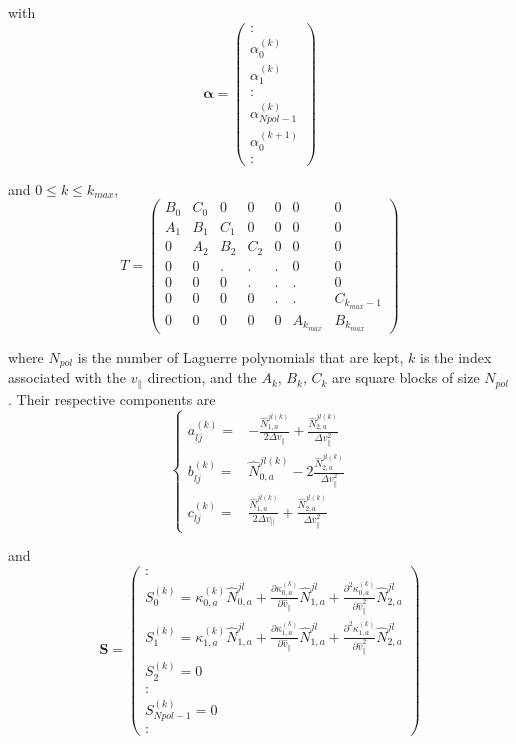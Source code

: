 \documentclass[11pt,preprint]{elsarticle}
\begin{document}
with 
\[
\boldsymbol{\alpha}=\left(\begin{array}{c}
:\\
\alpha_{0}^{(k)}\\
\alpha_{1}^{(k)}\\
:\\
\alpha_{Npol-1}^{(k)}\\
\alpha_{0}^{(k+1)}\\
:
\end{array}\right)
\]


and $0\leq k\leq k_{max}$,
\[
T=\left(\begin{array}{ccccccc}
B_{0} & C_{0} & 0 & 0 & 0 & 0 & 0\\
A_{1} & B_{1} & C_{1} & 0 & 0 & 0 & 0\\
0 & A_{2} & B_{2} & C_{2} & 0 & 0 & 0\\
0 & 0 & . & . & . & 0 & 0\\
0 & 0 & 0 & . & . & . & 0\\
0 & 0 & 0 & 0 & . & . & C_{k_{max}-1}\\
0 & 0 & 0 & 0 & 0 & A_{k_{max}} & B_{k_{max}}
\end{array}\right)
\]


where $N_{pol}$ is the number of Laguerre polynomials that are kept,
$k$ is the index associated with the $v_{\parallel}$ direction,
and the $A_{k}$, $B_{k}$, $C_{k}$ are square blocks of size $N_{pol}$.
Their respective components are
\[
\begin{cases}
a_{lj}^{(k)}= & -\frac{\hat{N}_{1,a}^{jl(k)}}{2\Delta v_{\parallel}}+\frac{\hat{N}_{2,a}^{jl(k)}}{\Delta v_{\parallel}^{2}}\\
b_{lj}^{(k)}= & \hat{N}_{0,a}^{jl(k)}-2\frac{\hat{N}_{2,a}^{jl(k)}}{\Delta v_{\parallel}^{2}}\\
c_{lj}^{(k)}= & \frac{\hat{N}_{1,a}^{jl(k)}}{2\Delta v_{\parallel}}+\frac{\hat{N}_{2,a}^{jl(k)}}{\Delta v_{\parallel}^{2}}
\end{cases}
\]


and 
\[
\boldsymbol{S}=\left(\begin{array}{c}
:\\
S_{0}^{(k)}=\kappa_{0,a}^{(k)}\hat{N}_{0,a}^{jl}+\frac{\partial\kappa_{0,a}^{(k)}}{\partial\hat{v}_{\parallel}}\hat{N}_{1,a}^{jl}+\frac{\partial^{2}\kappa_{0,a}^{(k)}}{\partial\hat{v}_{\parallel}^{2}}\hat{N}_{2,a}^{jl}\\
S_{1}^{(k)}=\kappa_{1,a}^{(k)}\hat{N}_{1,a}^{jl}+\frac{\partial\kappa_{1,a}^{(k)}}{\partial\hat{v}_{\parallel}}\hat{N}_{1,a}^{jl}+\frac{\partial^{2}\kappa_{1,a}^{(k)}}{\partial\hat{v}_{\parallel}^{2}}\hat{N}_{2,a}^{jl}\\
S_{2}^{(k)}=0\\
:\\
S_{Npol-1}^{(k)}=0\\
:
\end{array}\right)
\]
\end{document}
